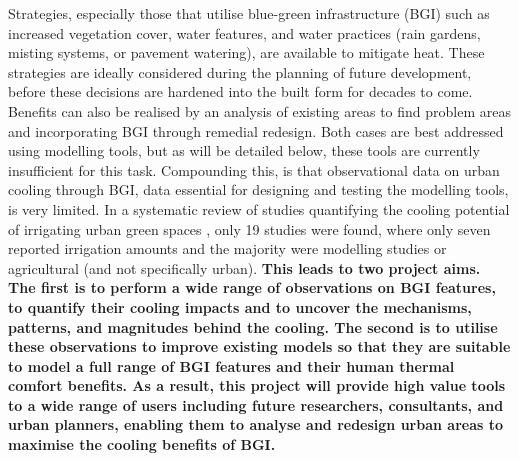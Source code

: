 Strategies, especially those that utilise blue-green infrastructure (BGI)\cite{Norton2015,Bowler2010,Gunawardena2017,Newton2020} such as increased vegetation cover, water features, and water practices (rain gardens, misting systems, or pavement watering), are available to mitigate heat. These strategies are ideally considered during the planning of future development, before these decisions are hardened into the built form for decades to come. Benefits can also be realised by an analysis of existing areas to find problem areas and incorporating BGI through remedial redesign. Both cases are best addressed using modelling tools, but as will be detailed below, these tools are currently insufficient for this task. Compounding this, is that observational data on urban cooling through BGI, data essential for designing and testing the modelling tools, is very limited. In a systematic review of studies quantifying the cooling potential of irrigating urban green spaces \cite{Cheung2021}, only 19 studies were found, where only seven reported irrigation amounts and the majority were modelling studies or agricultural (and not specifically urban). \textbf{This leads to two project aims. The first is to perform a wide range of observations on BGI features, to quantify their cooling impacts and to uncover the mechanisms, patterns, and magnitudes behind the cooling. The second is to utilise these observations to improve existing models so that they are suitable to model a full range of BGI features and their human thermal comfort benefits. As a result, this project will provide high value tools to a wide range of users including future researchers, consultants, and urban planners, enabling them to analyse and redesign urban areas to maximise the cooling benefits of BGI.}

